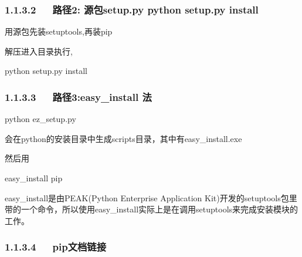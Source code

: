 \documentclass[letterpaper,12pt,english]{sphinxmanual}
\begin{document}
\subsubsection{1.1.3.2   路径2: 源包setup.py python setup.py install}
\label{\detokenize{001software/001install/python:setup-py-python-setup-py-install}}
\begin{DUlineblock}{0em}
\item[] 用源包先装setuptools,再装pip
\item[] 
\item[] 
\item[] 
\item[] 解压进入目录执行,
\item[] python setup.py install
\end{DUlineblock}


\subsubsection{1.1.3.3   路径3:easy\_install 法}
\label{\detokenize{001software/001install/python:easy-install}}
\begin{DUlineblock}{0em}
\item[] 
\item[] python ez\_setup.py
\item[] 会在python的安装目录中生成scripts目录，其中有easy\_install.exe
\end{DUlineblock}

\begin{DUlineblock}{0em}
\item[] 然后用
\item[] easy\_install pip
\end{DUlineblock}

easy\_install是由PEAK(Python Enterprise Application
Kit)开发的setuptools包里带的一个命令，所以使用easy\_install实际上是在调用setuptools来完成安装模块的工作。


\subsubsection{1.1.3.4   pip文档链接}
\label{\detokenize{001software/001install/python:id4}}
\begin{DUlineblock}{0em}
\item[] 
\item[] 
\item[] 
\end{DUlineblock}
\end{document}
